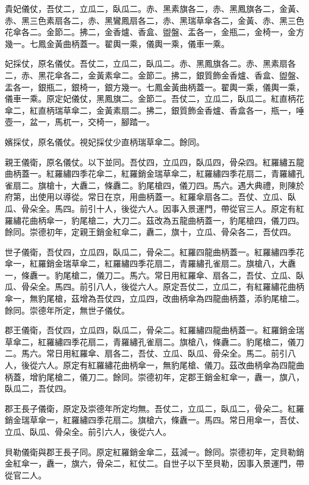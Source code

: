 \begin{pinyinscope}
貴妃儀仗，吾仗二，立瓜二，臥瓜二。赤、黑素旗各二，赤、黑鳳旗各二，金黃、赤、黑三色素扇各二，赤、黑鸞鳳扇各二，赤、黑瑞草傘各二，金黃、赤、黑三色花傘各二。金節二。拂二，金香爐、香盒、盥盤、盂各一，金瓶二，金椅一，金方幾一。七鳳金黃曲柄蓋一。翟輿一乘，儀輿一乘，儀車一乘。

妃採仗，原名儀仗。吾仗二，立瓜二，臥瓜二。赤、黑鳳旗各二。赤、黑素扇各二，赤、黑花傘各二，金黃素傘二。金節二。拂二，銀質飾金香爐、香盒、盥盤、盂各一，銀瓶二，銀椅一，銀方幾一。七鳳金黃曲柄蓋一。翟輿一乘，儀輿一乘，儀車一乘。原定妃儀仗，黑鳳旗二。金節二。吾仗二，立瓜二，臥瓜二。紅直柄花傘二，紅直柄瑞草傘二，金黃素扇二。拂二，銀質飾金香爐、香盒各一，瓶一，唾壺一，盆一，馬杌一，交椅一，腳踏一。

嬪採仗，原名儀仗。視妃採仗少直柄瑞草傘二。餘同。

親王儀衛，原名儀仗。以下並同。吾仗四，立瓜四，臥瓜四，骨朵四。紅羅繡五龍曲柄蓋一。紅羅繡四季花傘二，紅羅銷金瑞草傘二，紅羅繡四季花扇二，青羅繡孔雀扇二。旗槍十，大纛二，條纛二。豹尾槍四，儀刀四。馬六。遇大典禮，則陳於府第，出使用以導從。常日在京，用曲柄蓋一。紅羅傘扇各二。吾仗、立瓜、臥瓜、骨朵全。馬四。前引十人，後從六人。因事入景運門，帶從官三人。原定有紅羅繡花曲柄傘一，豹尾槍二，大刀二。茲改為五龍曲柄蓋一，豹尾槍四，儀刀四。餘同。崇德初年，定親王銷金紅傘二，纛二，旗十，立瓜、骨朵各二，吾仗四。

世子儀衛，吾仗四，立瓜四，臥瓜二，骨朵二。紅羅四龍曲柄蓋一。紅羅繡四季花傘一，紅羅銷金瑞草傘二，紅羅繡四季花扇二，青羅繡孔雀扇二。旗槍八，大纛一，條纛一。豹尾槍二，儀刀二。馬六。常日用紅羅傘、扇各二，吾仗、立瓜、臥瓜、骨朵全。馬四。前引八人，後從六人。原定吾仗二，立瓜二，有紅羅繡花曲柄傘一，無豹尾槍，茲增為吾仗四，立瓜四，改曲柄傘為四龍曲柄蓋，添豹尾槍二。餘同。崇德年所定，無世子儀仗。

郡王儀衛，吾仗四，立瓜四，臥瓜二，骨朵二。紅羅繡四龍曲柄蓋一。紅羅銷金瑞草傘二，紅羅繡四季花扇二，青羅繡孔雀扇二。旗槍八，條纛二。豹尾槍二，儀刀二。馬六。常日用紅羅傘、扇各二，吾仗、立瓜、臥瓜、骨朵全。馬二。前引八人，後從六人。原定有紅羅繡花曲柄傘一，無豹尾槍、儀刀。茲改曲柄傘為四龍曲柄蓋，增豹尾槍二，儀刀二。餘同。崇德初年，定郡王銷金紅傘一，纛一，旗八，臥瓜二，吾仗四。

郡王長子儀衛，原定及崇德年所定均無。吾仗二，立瓜二，臥瓜二，骨朵二。紅羅銷金瑞草傘一，紅羅繡四季花扇二。旗槍六，條纛一。馬四。常日用傘一，吾仗、立瓜、臥瓜、骨朵全。前引六人，後從六人。

貝勒儀衛與郡王長子同。原定紅羅銷金傘二，茲減一。餘同。崇德初年，定貝勒銷金紅傘一，纛一，旗六，骨朵二，紅仗二。自世子以下至貝勒，因事入景運門，帶從官二人。


\end{pinyinscope}
